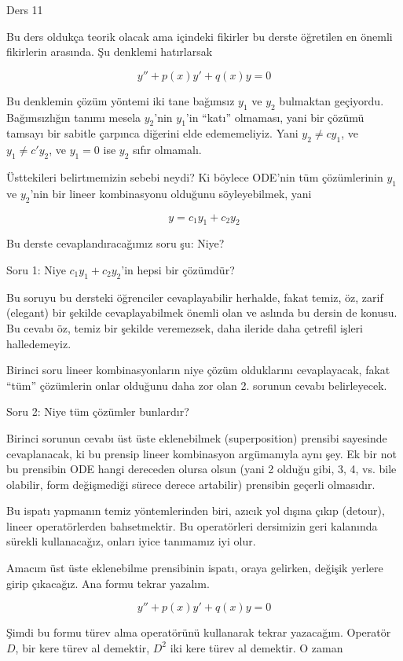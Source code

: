 \documentclass[12pt,fleqn]{article}\usepackage{../../common}
\begin{document}
Ders 11

Bu ders oldukça teorik olacak ama içindeki fikirler bu derste öğretilen en
önemli fikirlerin arasında. Şu denklemi hatırlarsak

$$ y'' + p(x)y' + q(x)y = 0 $$

Bu denklemin çözüm yöntemi iki tane bağımsız $y_1$ ve $y_2$ bulmaktan
geçiyordu. Bağımsızlığın tanımı mesela $y_2$'nin $y_1$'in ``katı''
olmaması, yani bir çözümü tamsayı bir sabitle çarpınca diğerini elde
edememeliyiz. Yani $y_2 \ne cy_1$, ve $y_1 \ne c'y_2$, ve $y_1 = 0$ ise
$y_2$ sıfır olmamalı. 

Üsttekileri belirtmemizin sebebi neydi? Ki böylece ODE'nin tüm çözümlerinin
$y_1$ ve $y_2$'nin bir lineer kombinasyonu olduğunu söyleyebilmek, yani

$$ y = c_1 y_1 + c_2 y_2 $$

Bu derste cevaplandıracağımız soru şu: Niye? 

Soru 1: Niye $c_1 y_1 + c_2 y_2$'in hepsi bir çözümdür?

Bu soruyu bu dersteki öğrenciler cevaplayabilir herhalde, fakat temiz, öz,
zarif (elegant) bir şekilde cevaplayabilmek önemli olan ve aslında bu
dersin de konusu. Bu cevabı öz, temiz bir şekilde veremezsek, daha ileride
daha çetrefil işleri halledemeyiz. 

Birinci soru lineer kombinasyonların niye çözüm olduklarını cevaplayacak,
fakat ``tüm'' çözümlerin onlar olduğunu daha zor olan 2. sorunun cevabı
belirleyecek.

Soru 2: Niye tüm çözümler bunlardır?

Birinci sorunun cevabı üst üste eklenebilmek (superposition) prensibi sayesinde
cevaplanacak, ki bu prensip lineer kombinasyon argümanıyla aynı şey. Ek bir not
bu prensibin ODE hangi dereceden olursa olsun (yani 2 olduğu gibi, 3, 4,
vs. bile olabilir, form değişmediği sürece derece artabilir) prensibin geçerli
olmasıdır.

Bu ispatı yapmanın temiz yöntemlerinden biri, azıcık yol dışına çıkıp
(detour), lineer operatörlerden bahsetmektir. Bu operatörleri dersimizin
geri kalanında sürekli kullanacağız, onları iyice tanımamız iyi olur. 

Amacım üst üste eklenebilme prensibinin ispatı, oraya gelirken, değişik
yerlere girip çıkacağız. Ana formu tekrar yazalım. 

$$ y'' + p(x)y' + q(x)y = 0 $$

Şimdi bu formu türev alma operatörünü kullanarak tekrar yazacağım. Operatör
$D$, bir kere türev al demektir, $D^2$ iki kere türev al demektir. O zaman
\end{document}
